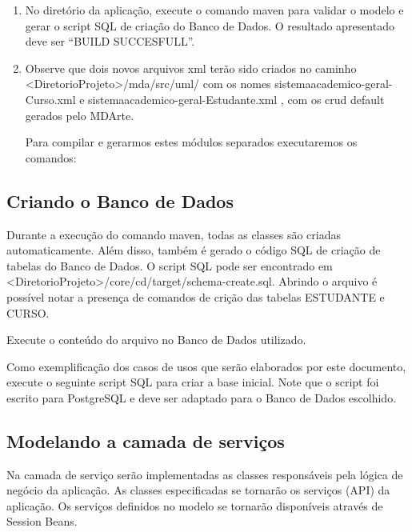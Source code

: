 \begin{enumerate}
\item No diretório da aplicação, execute o comando maven para validar o modelo e gerar o script SQL de criação do Banco de Dados. O resultado apresentado deve ser “BUILD SUCCESFULL”. 
	
\item Observe que dois novos arquivos xml terão sido criados no caminho <DiretorioProjeto>/mda/src/uml/ com os nomes sistemaacademico-geral-Curso.xml e sistemaacademico-geral-Estudante.xml , com os crud default gerados pelo MDArte.

Para compilar e gerarmos estes módulos separados executaremos os comandos:
	
\begin{framed}
	
\end{framed}

\end{enumerate}

\subsection{Criando o Banco de Dados}

Durante a execução do comando maven, todas as classes são criadas automaticamente. Além disso, também é gerado o código SQL de criação de tabelas do Banco de Dados. O script SQL pode ser encontrado em <DiretorioProjeto>/core/cd/target/schema-create.sql. Abrindo o arquivo é possível notar a presença de comandos de crição das tabelas ESTUDANTE e CURSO.

Execute o conteúdo do arquivo no Banco de Dados utilizado.

Como exemplificação dos casos de usos que serão elaborados por este documento, execute o seguinte script SQL para criar a base inicial. Note que o script foi escrito para PostgreSQL e deve ser adaptado para o Banco de Dados escolhido.

\begin{framed}
	
\end{framed}

\subsection{Modelando a camada de serviços}

Na camada de serviço serão implementadas as classes responsáveis pela lógica de negócio da aplicação. As classes especificadas se tornarão os serviços (API) da aplicação. Os serviços definidos no modelo se tornarão disponíveis através de Session Beans.

